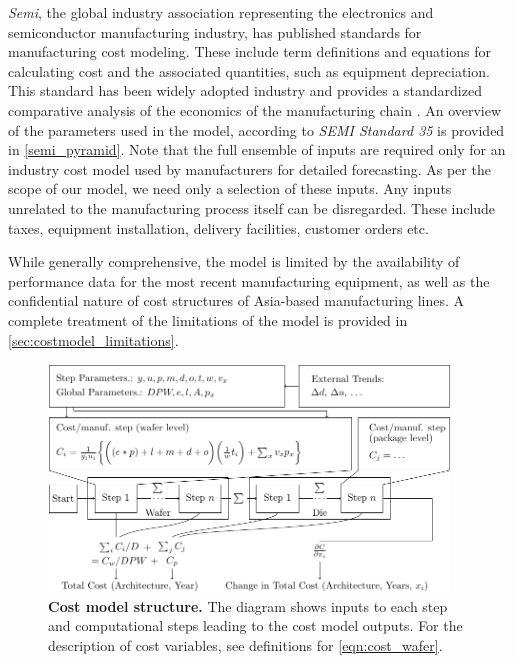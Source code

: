 \documentclass[parskip=full]{article}
\begin{document}
\textit{Semi}, the global industry association representing the electronics and semiconductor manufacturing industry, has published standards for manufacturing cost modeling. These include term definitions and equations for calculating cost and the associated quantities, such as equipment depreciation. This standard has been widely adopted industry and provides a standardized comparative analysis of the economics of the manufacturing chain \cite{ragona2002cost}\cite{wouters2018industry}. An overview of the parameters used in the model, according to \textit{SEMI Standard 35} is provided in \cref{semi_pyramid}. Note that the full ensemble of inputs are required only for an industry cost model used by manufacturers for detailed forecasting. As per the scope of our model, we need only a selection of these inputs. Any inputs unrelated to the manufacturing process itself can be disregarded. These include taxes, equipment installation, delivery facilities, customer orders etc.

While generally comprehensive, the model is limited by the availability of performance data for the most recent manufacturing equipment, as well as the confidential nature of cost structures of Asia-based manufacturing lines. A complete treatment of the limitations of the model is provided in \cref{sec:costmodel_limitations}.

\clearpage

\begin{figure}[H]
    \centering
    \includegraphics[width=0.95\textwidth]{./figures/costmodel.pdf}
    \caption{\textbf{Cost model structure.} The diagram shows inputs to each step and computational steps leading to the cost model outputs. For the description of cost variables, see definitions for \cref{eqn:cost_wafer}.}
    \label{fig:costmodel-schematic}
\end{figure}
\end{document}
